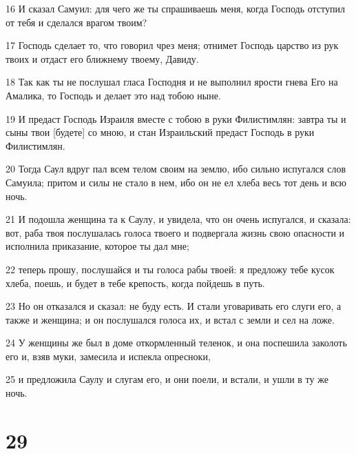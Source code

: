 \par 16 И сказал Самуил: для чего же ты спрашиваешь меня, когда Господь отступил от тебя и сделался врагом твоим?
\par 17 Господь сделает то, что говорил чрез меня; отнимет Господь царство из рук твоих и отдаст его ближнему твоему, Давиду.
\par 18 Так как ты не послушал гласа Господня и не выполнил ярости гнева Его на Амалика, то Господь и делает это над тобою ныне.
\par 19 И предаст Господь Израиля вместе с тобою в руки Филистимлян: завтра ты и сыны твои [будете] со мною, и стан Израильский предаст Господь в руки Филистимлян.
\par 20 Тогда Саул вдруг пал всем телом своим на землю, ибо сильно испугался слов Самуила; притом и силы не стало в нем, ибо он не ел хлеба весь тот день и всю ночь.
\par 21 И подошла женщина та к Саулу, и увидела, что он очень испугался, и сказала: вот, раба твоя послушалась голоса твоего и подвергала жизнь свою опасности и исполнила приказание, которое ты дал мне;
\par 22 теперь прошу, послушайся и ты голоса рабы твоей: я предложу тебе кусок хлеба, поешь, и будет в тебе крепость, когда пойдешь в путь.
\par 23 Но он отказался и сказал: не буду есть. И стали уговаривать его слуги его, а также и женщина; и он послушался голоса их, и встал с земли и сел на ложе.
\par 24 У женщины же был в доме откормленный теленок, и она поспешила заколоть его и, взяв муки, замесила и испекла опресноки,
\par 25 и предложила Саулу и слугам его, и они поели, и встали, и ушли в ту же ночь.

\chapter{29}

